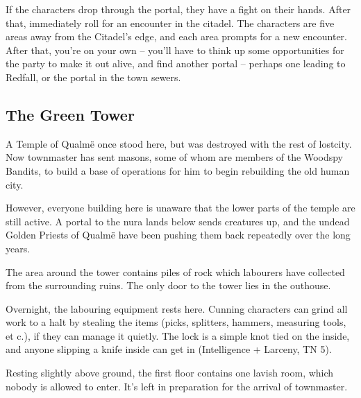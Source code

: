 \begin{multicols}{2}
If the characters drop through the portal, they have a fight on their hands.  After that, immediately roll for an encounter in the citadel.  The characters are five areas away from the Citadel's edge, and each area prompts for a new encounter.  After that, you're on your own -- you'll have to think up some opportunities for the party to make it out alive, and find another portal -- perhaps one leading to Redfall, or the portal in the town sewers.

\subsection{The Green Tower}\label{green_tower}\setcounter{list}{0}

\begin{figure*}[t]

\label{green_tower_map}

\end{figure*}

A Temple of Qualm\"{e} once stood here, but was destroyed with the rest of \gls{lostcity}.
Now \gls{townmaster} has sent masons, some of whom are members of the Woodspy Bandits, to build a base of operations for him to begin rebuilding the old human city.

However, everyone building here is unaware that the lower parts of the temple are still active.
A portal to the nura lands below sends creatures up, and the undead Golden Priests of Qualm\"{e} have been pushing them back repeatedly over the long years.


The area around the tower contains piles of rock which labourers have collected from the surrounding ruins.  The only door to the tower lies in the outhouse.



Overnight, the labouring equipment rests here.  Cunning characters can grind all work to a halt by stealing the items (picks, splitters, hammers, measuring tools, et c.), if they can manage it quietly.  The lock is a simple knot tied on the inside, and anyone slipping a knife inside can get in (Intelligence + Larceny, TN 5).


Resting slightly above ground, the first floor contains one lavish room, which nobody is allowed to enter.  It's left in preparation for the arrival of \gls{townmaster}.


\end{multicols}

